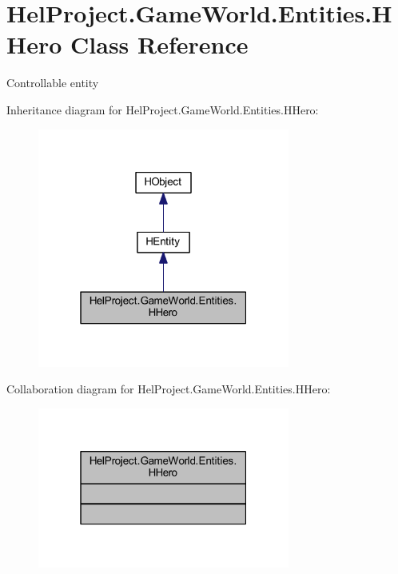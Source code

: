 \hypertarget{class_hel_project_1_1_game_world_1_1_entities_1_1_h_hero}{}\section{Hel\+Project.\+Game\+World.\+Entities.\+H\+Hero Class Reference}
\label{class_hel_project_1_1_game_world_1_1_entities_1_1_h_hero}


Controllable entity  




Inheritance diagram for Hel\+Project.\+Game\+World.\+Entities.\+H\+Hero\+:\nopagebreak
\begin{figure}[H]
\begin{center}
\leavevmode
\includegraphics[width=235pt]{class_hel_project_1_1_game_world_1_1_entities_1_1_h_hero__inherit__graph}
\end{center}
\end{figure}


Collaboration diagram for Hel\+Project.\+Game\+World.\+Entities.\+H\+Hero\+:\nopagebreak
\begin{figure}[H]
\begin{center}
\leavevmode
\includegraphics[width=235pt]{class_hel_project_1_1_game_world_1_1_entities_1_1_h_hero__coll__graph}
\end{center}
\end{figure}

